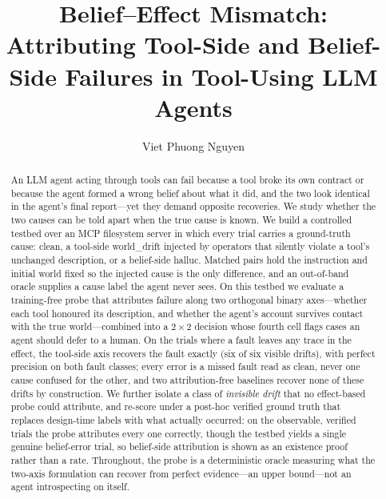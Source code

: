 \documentclass[runningheads]{llncs}
\begin{document}
\title{Belief--Effect Mismatch: Attributing Tool-Side and Belief-Side Failures in Tool-Using LLM Agents}
\author{Viet Phuong Nguyen}

\maketitle

\begin{abstract}
An LLM agent acting through tools can fail because a tool broke its own contract or because the agent formed a wrong belief about what it did, and the two look identical in the agent's final report---yet they demand opposite recoveries. We study whether the two causes can be told apart when the true cause is known. We build a controlled testbed over an MCP filesystem server in which every trial carries a ground-truth cause: \textsf{clean}, a tool-side \textsf{world\_drift} injected by operators that silently violate a tool's unchanged description, or a belief-side \textsf{halluc}. Matched pairs hold the instruction and initial world fixed so the injected cause is the only difference, and an out-of-band oracle supplies a cause label the agent never sees. On this testbed we evaluate a training-free probe that attributes failure along two orthogonal binary axes---whether each tool honoured its description, and whether the agent's account survives contact with the true world---combined into a $2\times2$ decision whose fourth cell flags cases an agent should defer to a human. On the trials where a fault leaves any trace in the effect, the tool-side axis recovers the fault exactly (six of six visible drifts), with perfect precision on both fault classes; every error is a missed fault read as \textsf{clean}, never one cause confused for the other, and two attribution-free baselines recover none of these drifts by construction. We further isolate a class of \emph{invisible drift} that no effect-based probe could attribute, and re-score under a post-hoc verified ground truth that replaces design-time labels with what actually occurred: on the observable, verified trials the probe attributes every one correctly, though the testbed yields a single genuine belief-error trial, so belief-side attribution is shown as an existence proof rather than a rate. Throughout, the probe is a deterministic oracle measuring what the two-axis formulation can recover from perfect evidence---an upper bound---not an agent introspecting on itself.
\end{abstract}
\end{document}
